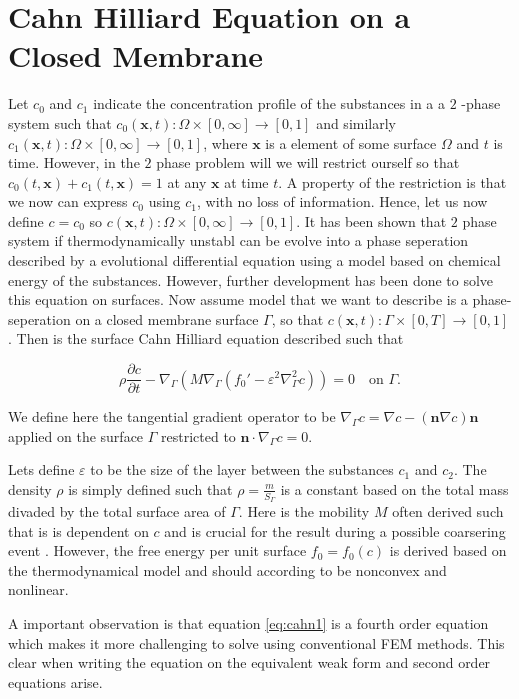 
\newpage
\section{Cahn Hilliard Equation on a Closed Membrane}%
\label{sec:cahn_hilliard_equation}


Let $c_0$ and $c_1$  indicate the concentration profile of the substances in a a $2$ -phase system such
that $c_0 \left( \mathbf{x},t \right): \Omega  \times \left[ 0, \infty \right] \to \left[ 0,1 \right]$ and
similarly $c_1 \left( \mathbf{x},t \right): \Omega \times \left[ 0, \infty \right] \to \left[ 0,1 \right]$, where
$\mathbf{x} $ is a element of some surface $\Omega $ and $t$ is time.
However, in the $2$ phase problem will we will restrict ourself so that $c_0\left( t,\mathbf{x} \right) + c_1\left( t,
\mathbf{x} \right) = 1$ at any $\mathbf{x} $ at time $t$. A property of the restriction is that we now can express
$c_0$ using $c_1$, with no loss of information. Hence, let us now define $c = c_0$ so $c \left( \mathbf{x},t \right):
\Omega  \times \left[ 0, \infty \right] \to \left[ 0,1 \right]$. It has been shown that $2$ phase system if
thermodynamically unstabl can be evolve
into a phase seperation
described by a evolutional differential equation \cite{cahnhilliard1957} using a model based on chemical energy of the
substances. However, further development has been done \cite{yushutin19} to solve this equation on surfaces. Now assume
model that we want to describe is a phase-seperation on a closed membrane surface $\Gamma $, so that $c \left( \mathbf{x},t \right):
\Gamma \times \left[ 0, T \right] \to \left[ 0,1 \right]$. Then is the surface Cahn Hilliard equation described such that

\begin{equation}
    \label{eq:cahn1}
\rho \frac{\partial c}{\partial  t}  - \nabla_{\Gamma } \left( M \nabla _{\Gamma } \left( f_{0}'  - \varepsilon ^2
        \nabla^2
_{\Gamma } c \right) \right) = 0  \quad \text{on } \Gamma
.\end{equation}

We define here the tangential gradient operator to be $\nabla _{\Gamma } c = \nabla c - \left( \mathbf{n} \nabla c
\right)\mathbf{n} $ applied on the surface $\Gamma $ restricted to $\mathbf{n} \cdot \nabla _{\Gamma } c = 0$.

Lets define $\varepsilon $ to be the size of the layer between the substances $c_{1}$ and $c_{2}$. The density $\rho $ is
simply defined such that $\rho = \frac{m}{S_{\Gamma }}$ is a constant based on the total mass divaded by the total
surface area of $\Gamma $.
Here is the mobility $M$ often derived such that is is dependent on $c$ and is crucial for the result during a possible
coarsering event \cite{yushutin19}.  However, the free energy per unit surface
$f_{0} = f_{0}\left( c \right)$ is derived based on the thermodynamical model and should according to \cite{yushutin19} be nonconvex and
nonlinear.

A important observation is that equation \eqref{eq:cahn1} is a fourth order equation which makes it more challenging to
solve using conventional FEM methods. This clear when writing the equation on the equivalent weak form and second order
equations arise.


\newpage
